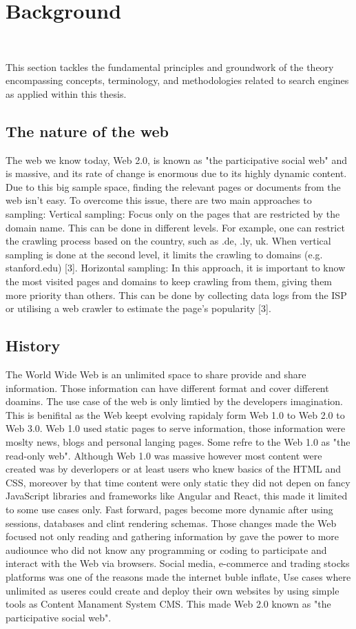 \chapter{Background}\
\label{chap:background}

This section tackles the fundamental principles and groundwork of the theory encompassing concepts, terminology, and methodologies related to search engines as applied within this thesis.

\section{The nature of the web}
The web we know today, Web 2.0, is known as "the participative social web" and is massive, and its rate of change is enormous due to its highly dynamic content. Due to this big sample space, finding the relevant pages or documents from the web isn't easy. To overcome this issue, there are two main approaches to sampling: 
Vertical sampling: Focus only on the pages that are restricted by the domain name. This can be done in different levels. For example, one can restrict the crawling process based on the country, such as .de, .ly, uk. When vertical sampling is done at the second level, it limits the crawling to domains (e.g. stanford.edu) [3].
Horizontal sampling: In this approach, it is important to know the most visited pages and domains to keep crawling from them, giving them more priority than others. This can be done by collecting data logs from the ISP or utilising a web crawler to estimate the page's popularity [3]. 


\section{History}

The World Wide Web is an unlimited space to share provide and share information. Those information can have different format and cover different doamins. The use case of the web is only limtied by the developers imagination. This is benifital as the Web keept evolving rapidaly form Web 1.0 to Web 2.0 to Web 3.0. Web 1.0 used static pages to serve information, those information were moslty news, blogs and personal langing pages. Some refre to the Web 1.0 as "the read-only web". Although Web 1.0 was massive however most content were created was by deverlopers or at least users who knew basics of the HTML and CSS, moreover by that time content were only static they did not depen on fancy JavaScript libraries and frameworks like Angular and React, this made it limited to some use cases only. Fast forward, pages become more dynamic after using sessions, databases and clint rendering schemas. Those changes made the Web focused not only reading and gathering information by gave the power to more audiounce who did not know any programming or coding to participate and interact with the Web via browsers. Social media, e-commerce and trading stocks platforms was one of the reasons made the internet buble inflate, Use cases where unlimited as useres could create and deploy their own websites by using simple tools as Content Manament System CMS. This made Web 2.0 known as "the participative social web".


